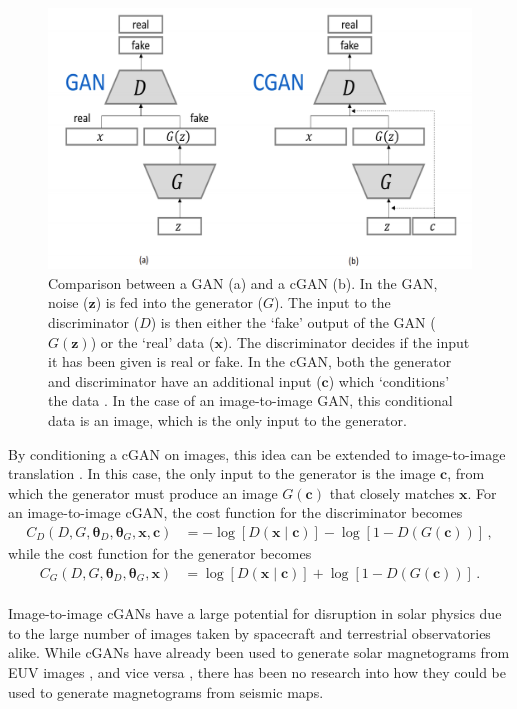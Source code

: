 \documentclass[11pt,a4paper,onecolumn]{report}
\begin{document}
\begin{figure}[t]
  \centering
  \includegraphics[width = 0.6\linewidth]{gan_cgan.png}
  \caption{Comparison between a GAN (a) and a cGAN (b). In the GAN, noise
  (\(\bm{z}\)) is fed into the generator (\(G\)). The input to the discriminator
  (\(D\)) is then either the `fake' output of the GAN (\(G(\bm{z})\)) or the
  `real' data (\(\bm{x}\)). The discriminator decides if the input it has been
  given is real or fake. In the cGAN, both the generator and discriminator have
  an additional input (\(\bm{c}\)) which `conditions' the data
  \citep{mirza_conditional_2014}. In the case of an image-to-image GAN, this
  conditional data is an image, which is the only input to the generator. }
  \label{fig:gans}
\end{figure}


By conditioning a cGAN on images, this idea can be extended to image-to-image
translation \citep{isola2017image}. In this case, the only input to the generator
is the image \(\bm{c}\), from which the generator must produce an image
\(G(\bm{c})\) that closely matches \(\bm{x}\). For an image-to-image cGAN, the
cost function for the discriminator becomes
\begin{align}
  C_D(D, G, \bm{\theta}_D, \bm{\theta}_G, \bm{x}, \bm{c}) &=
  -\log[D(\bm{x}\mid \bm{c})] - \log[1 - D(G(\bm{c}))]\,,
\end{align}
while the cost function for the generator becomes
\begin{align}
  C_G(D, G, \bm{\theta}_D, \bm{\theta}_G, \bm{x})
  &= \log[D(\bm{x}\mid \bm{c})] + \log[1 - D(G(\bm{c}))]\,.
\end{align}\\


Image-to-image cGANs have a large potential for disruption in solar physics due
to the large number of images taken by spacecraft and terrestrial observatories
alike. While cGANs have already been used to generate solar magnetograms from EUV images
\citep{Kim2019}, and vice versa \citep{park_generation_2019}, there has been no
research into how they could be used to generate magnetograms from seismic maps.
\end{document}
